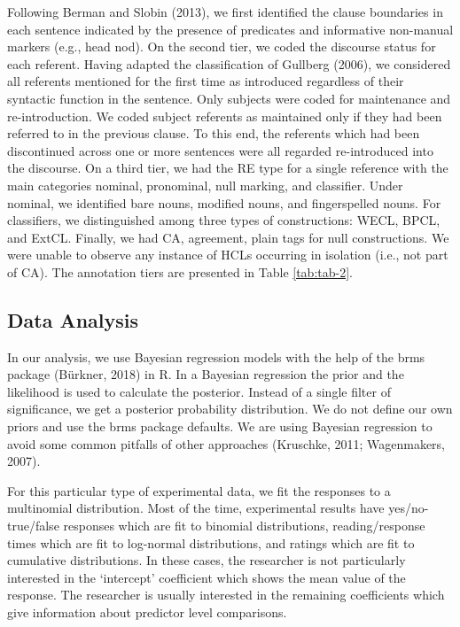 \documentclass[]{elsarticle} %
\begin{document}
Following Berman and Slobin (2013), we first identified the clause
boundaries in each sentence indicated by the presence of predicates and
informative non-manual markers (e.g., head nod). On the second tier, we
coded the discourse status for each referent. Having adapted the
classification of Gullberg (2006), we considered all referents mentioned
for the first time as introduced regardless of their syntactic function
in the sentence. Only subjects were coded for maintenance and
re-introduction. We coded subject referents as maintained only if they
had been referred to in the previous clause. To this end, the referents
which had been discontinued across one or more sentences were all
regarded re-introduced into the discourse. On a third tier, we had the
RE type for a single reference with the main categories nominal,
pronominal, null marking, and classifier. Under nominal, we identified
bare nouns, modified nouns, and fingerspelled nouns. For classifiers, we
distinguished among three types of constructions: WECL, BPCL, and ExtCL.
Finally, we had CA, agreement, plain tags for null constructions. We
were unable to observe any instance of HCLs occurring in isolation
(i.e., not part of CA). The annotation tiers are presented in Table
\ref{tab:tab-2}.

\hypertarget{data-analysis}{%
\subsection{Data Analysis}\label{data-analysis}}

In our analysis, we use Bayesian regression models with the help of the
brms package (Bürkner, 2018) in R. In a Bayesian regression the prior
and the likelihood is used to calculate the posterior. Instead of a
single filter of significance, we get a posterior probability
distribution. We do not define our own priors and use the brms package
defaults. We are using Bayesian regression to avoid some common pitfalls
of other approaches (Kruschke, 2011; Wagenmakers, 2007).

For this particular type of experimental data, we fit the responses to a
multinomial distribution. Most of the time, experimental results have
yes/no-true/false responses which are fit to binomial distributions,
reading/response times which are fit to log-normal distributions, and
ratings which are fit to cumulative distributions. In these cases, the
researcher is not particularly interested in the `intercept' coefficient
which shows the mean value of the response. The researcher is usually
interested in the remaining coefficients which give information about
predictor level comparisons.
\end{document}
